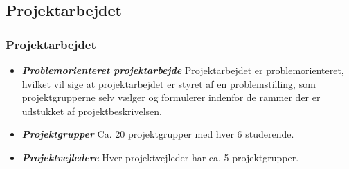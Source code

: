 \documentclass[t, aspectratio=169]{beamer}
\newcommand{\textdesc}[1]{\textit{\textbf{#1}}}
\newcommand{\descitem}[1]{\item \textdesc{#1}}
\begin{document}
\subsection{Projektarbejdet}
\begin{frame}[fragile]
  \frametitle{Projektarbejdet}
  
  \vspace{7mm}
  \begin{itemize}
    \setlength\itemsep{7mm}
    \descitem{Problemorienteret projektarbejde} Projektarbejdet er problemorienteret, hvilket vil sige at projektarbejdet er styret af en problemstilling, som projektgrupperne selv vælger og formulerer indenfor de rammer der er udstukket af projektbeskrivelsen.
    \descitem{Projektgrupper} Ca. 20 projektgrupper med hver 6 studerende.
    \descitem{Projektvejledere} Hver projektvejleder har ca. 5 projektgrupper.
  \end{itemize}
\end{frame}
\end{document}

